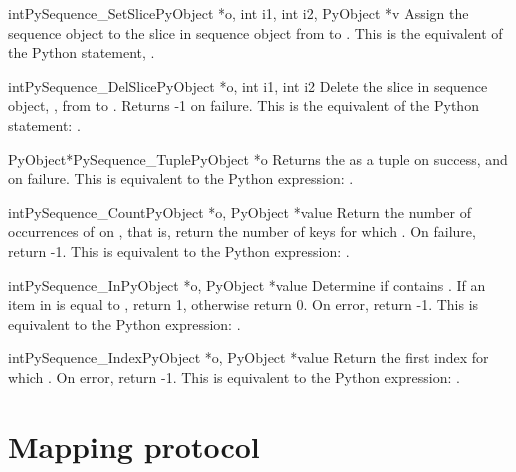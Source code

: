      \begin{cfuncdesc}{int}{PySequence_SetSlice}{PyObject *o, int i1, int i2, PyObject *v}
         Assign the sequence object  to the slice in sequence
	 object  from  to .  This is the equivalent of the Python
	 statement, .
     \end{cfuncdesc}

     \begin{cfuncdesc}{int}{PySequence_DelSlice}{PyObject *o, int i1, int i2}
	 Delete the slice in sequence object, , from  to .
	 Returns -1 on failure. This is the equivalent of the Python
	 statement: .
     \end{cfuncdesc}

     \begin{cfuncdesc}{PyObject*}{PySequence_Tuple}{PyObject *o}
	 Returns the  as a tuple on success, and {\NULL} on failure.
	 This is equivalent to the Python expression: .
     \end{cfuncdesc}

     \begin{cfuncdesc}{int}{PySequence_Count}{PyObject *o, PyObject *value}
         Return the number of occurrences of  on , that is,
	 return the number of keys for which .  On
	 failure, return -1.  This is equivalent to the Python
	 expression: .
     \end{cfuncdesc}

     \begin{cfuncdesc}{int}{PySequence_In}{PyObject *o, PyObject *value}
	 Determine if  contains .  If an item in  is equal to
	 , return 1, otherwise return 0.  On error, return -1.  This
	 is equivalent to the Python expression: .
     \end{cfuncdesc}

     \begin{cfuncdesc}{int}{PySequence_Index}{PyObject *o, PyObject *value}
	 Return the first index for which .  On error,
	 return -1.    This is equivalent to the Python
	 expression: .
     \end{cfuncdesc}

\section{Mapping protocol}

